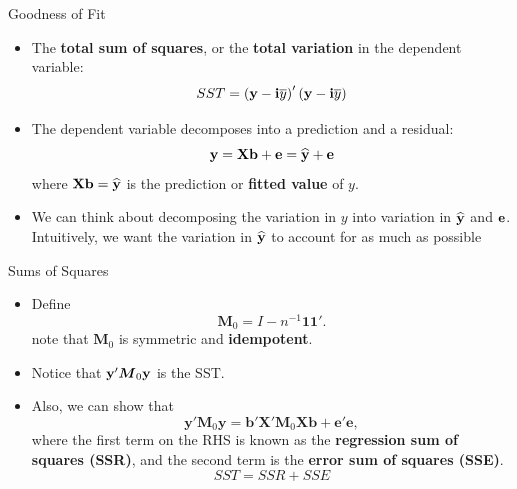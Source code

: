 \begin{frame}{Goodness of Fit}
\begin{itemize}
	\item The {\bf total sum of squares}, or the {\bf total variation} in the dependent variable:\[
	SST = \left({\bf y} - {\bf i} \overline{y} \right)' \left({\bf y} - {\bf i} \overline{y} \right)
	\]

	\smallskip
	\item The dependent variable decomposes into a prediction and a residual:\[
	{\bf y} = {\bf X} {\bf b} + {\bf e} =  \widehat{{\bf y}} + {\bf e}
	\]
where ${\bf X} {\bf b} =  \widehat{{\bf y}}$ is the prediction or {\bf fitted value} of $y$. 

	\smallskip
	\item We can think about decomposing the variation in $y$ into variation in $ \widehat{{\bf y}}$ and ${\bf e}$.
	Intuitively, we want the variation in  $ \widehat{{\bf y}}$ to account for as much as possible
\end{itemize}
\end{frame}



\begin{frame}{Sums of Squares}
\begin{itemize}
	\item Define \[
\boldsymbol{M}_{0}=I-n^{-1}\boldsymbol{1}\boldsymbol{1}'.
\]
note that $\boldsymbol{M}_{0}$ is symmetric and {\bf idempotent}.

\smallskip
\item Notice that $ {\bf y}'\boldsymbol{M}_{0}{\bf y}$ is the SST. 

\smallskip
\item Also, we can show that
\[
\boldsymbol{y}'\boldsymbol{M}_{0}\boldsymbol{y}=\boldsymbol{b}'\boldsymbol{X}'\boldsymbol{M}_{0}\boldsymbol{X}\boldsymbol{b}+\boldsymbol{e}'\boldsymbol{e},
\]
where the first term on the RHS is known as the \textbf{regression
sum of squares (SSR)}, and the second term is the \textbf{error sum
of squares (SSE)}.\[
SST = SSR + SSE
\]
	
\end{itemize}
\end{frame}

